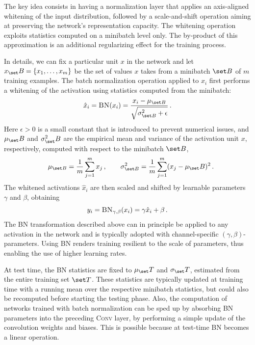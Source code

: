 \documentclass[10pt,twocolumn,letterpaper]{article}
\begin{document}
The key idea consists in having a normalization layer that applies an axis-aligned whitening of the input distribution, followed by a scale-and-shift operation aiming at preserving the network's representation capacity.
The whitening operation exploits statistics computed on a minibatch level only. The by-product of this approximation is an additional regularizing effect for the training process.

In details, we can fix a particular unit $x$ in the network and let $x_\set B=\{x_1,\dots,x_m\}$ be the set of values $x$ takes from a minibatch $\set B$ of $m$ training examples. The batch normalization operation applied to $x_i$ first performs a whitening of the activation using statistics computed from the minibatch:
\begin{equation}
	\hat x_i=\textsc{BN}(x_i)=\frac{x_i-\mu_{\set B}}{\sqrt{\sigma^2_{\set B}+\epsilon}}\,.
	\label{eq:xhat}
\end{equation}
Here $\epsilon>0$ is a small constant that is introduced to prevent numerical issues, 
and $\mu_\set B$ and $\sigma^2_\set B$ are the empirical mean and variance of the activation unit $x$, respectively,  computed with respect to the minibatch $\set B$, \ie
\[
	\quad \mu_{\set B}=\frac{1}{m}\sum_{j=1}^m x_j\,,\qquad\sigma^2_{\set B}=\frac{1}{m}\sum_{j=1}^m(x_j-\mu_\set B)^2\,.
\]
The whitened activations $\hat x_i$ are then scaled and shifted by learnable parameters $\gamma$ and $\beta$, obtaining
\[
	y_i=\textsc{BN}_{\gamma,\beta}(x_i)=\gamma \hat x_i+\beta\,.
\]
The \textsc{BN} transformation described above can in principle be applied to any activation in the network and is typically adopted with channel-specific $(\gamma,\beta)$-parameters. Using \textsc{BN} %
renders training resilient to the scale of parameters, thus enabling the use of higher learning rates.

At test time, the \textsc{BN} statistics are fixed to $\mu_\set T$ and $\sigma_\set T$, estimated from the entire training set $\set T$. These statistics are typically updated at training time with a running mean over the respective minibatch statistics, but could also be recomputed before starting the testing phase. Also, the computation of networks trained with batch normalization can be sped up by absorbing \textsc{BN} parameters into the preceding \textsc{Conv} layer, by performing a simple update of the convolution weights and biases. This is possible because at test-time \textsc{BN} becomes a linear operation.
\end{document}
